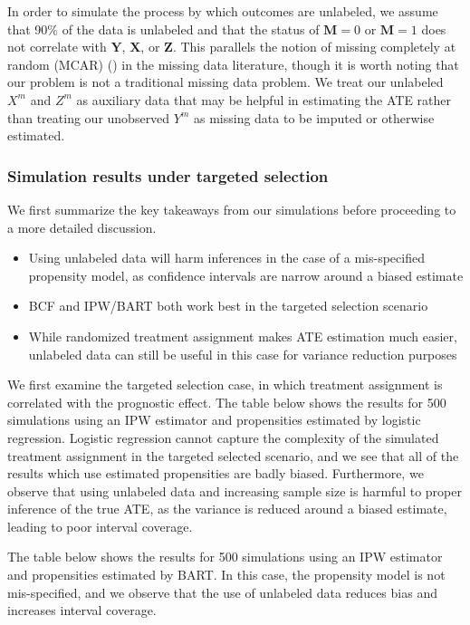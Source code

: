 \documentclass[aos]{imsart}
\newcommand{\X}{\mathbf{X}}
\newcommand{\M}{\mathbf{M}}
\newcommand{\Y}{\mathbf{Y}}
\newcommand{\Z}{\mathbf{Z}}
\begin{document}
In order to simulate the process by which outcomes are unlabeled, we assume that 90\% of the data is unlabeled and that the status of $\M = 0$ or $\M = 1$
does not correlate with $\Y$, $\X$, or $\Z$. This parallels the notion of missing completely at random (MCAR) (\cite{little2019statistical}) in the missing data 
literature, though it is worth noting that our problem is not a traditional missing data problem. We treat our unlabeled $X^m$ and $Z^m$ as auxiliary data that 
may be helpful in estimating the ATE rather than treating our unobserved $Y^m$ as missing data to be imputed or otherwise estimated.

\subsubsection{Simulation results under targeted selection}

We first summarize the key takeaways from our simulations before proceeding to a more detailed discussion. 

\begin{itemize}
	\item Using unlabeled data will harm inferences in the case of a mis-specified propensity model, as confidence intervals are narrow around a biased estimate
	\item BCF and IPW/BART both work best in the targeted selection scenario
	\item While randomized treatment assignment makes ATE estimation much easier, unlabeled data can still be useful in this case for variance reduction purposes
\end{itemize}

We first examine the targeted selection case, in which treatment assignment is correlated with the 
prognostic effect. The table below shows the results for 500 simulations using an IPW estimator and propensities 
estimated by logistic regression. Logistic regression cannot capture the complexity of the simulated 
treatment assignment in the targeted selected scenario, and we see that all of the results 
which use estimated propensities are badly biased. Furthermore, we observe that using unlabeled data 
and increasing sample size is harmful to proper inference of the true ATE, as the variance is reduced 
around a biased estimate, leading to poor interval coverage.



The table below shows the results for 500 simulations using an IPW estimator and propensities 
estimated by BART. In this case, the propensity model is not mis-specified, and we observe that 
the use of unlabeled data reduces bias and increases interval coverage.
\end{document}
